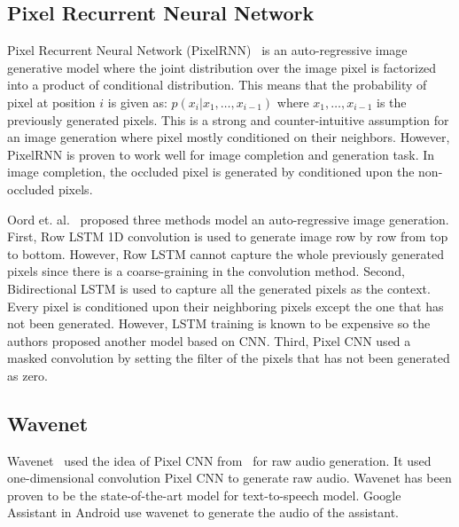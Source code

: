 \documentclass[runningheads]{llncs}
\begin{document}
\subsection{Pixel Recurrent Neural Network}
Pixel Recurrent Neural Network (PixelRNN)~\cite{oord2016pixel} is an auto-regressive image generative model where the joint distribution over the image pixel is factorized into a product of conditional distribution. This means that the probability of pixel at position $i$ is given as: $p(x_i | x_1, \dots, x_{i-1})$ where $x_1, \dots, x_{i-1}$ is the previously generated pixels. This is a strong and counter-intuitive assumption for an image generation where pixel mostly conditioned on their neighbors. However, PixelRNN is proven to  work well for image completion and generation task. In image completion, the occluded pixel is generated by conditioned upon the non-occluded pixels.

Oord et. al.~\cite{oord2016pixel} proposed three methods model an auto-regressive image generation.  First, Row LSTM 1D convolution is used to generate image row by row from top to bottom. However, Row LSTM cannot capture the whole previously generated pixels since there is a coarse-graining in the convolution method. Second, Bidirectional LSTM is used to capture all the generated pixels as the context. Every pixel is conditioned upon their neighboring pixels except the one that has not been generated. However, LSTM training is known to be expensive so the authors proposed another model based on CNN. Third, Pixel CNN used a masked convolution by setting the filter of the pixels that has not been generated as zero.


\subsection{Wavenet}
Wavenet~\cite{van2016wavenet} used the idea of Pixel CNN from~\cite{oord2016pixel} for raw audio generation. It used one-dimensional convolution Pixel CNN to generate raw audio. Wavenet has been proven to be the state-of-the-art model for text-to-speech model. Google Assistant in Android use wavenet to generate the audio of the assistant. 
\end{document}
